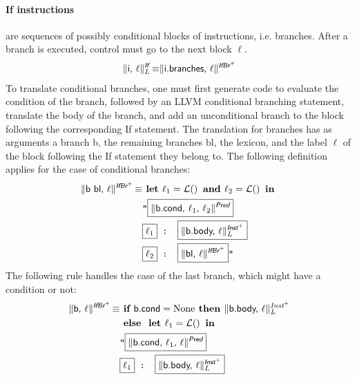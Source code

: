 \documentclass{llncs}
\newcommand{\trad}[2]{\ensuremath{\lVert \textsf{#1} \rVert^{\textit{#2}}}}
\DeclareMathOperator{\isdef}{\equiv}
\DeclareMathOperator{\lbl}{\mathcal{L}()}
\newcommand{\llvm}[1]{\texttt{#1}}
\newcommand{\B}[1]{\textsf{#1}}
\newcommand{\ListOf}[1]{$\mbox{#1}^+$}
\newcommand{\IF}[0]{\textbf{ if }}
\newcommand{\ELSE}[0]{\textbf{ else }}
\newcommand{\THEN}[0]{\textbf{ then }}
\newcommand{\LET}[0]{\textbf{ let }}
\newcommand{\IN}[0]{\textbf{ in }}
\newcommand{\AND}[0]{\textbf{ and }}
\newcommand{\PH}[1]{\framebox{$#1$}}
\begin{document}
\paragraph{If instructions} are sequences of possibly conditional blocks of
instructions, i.e. branches. After a branch is executed, control must go
to the next block $\ell$.
\begin{align*}
  \trad{i, $\ell$}{\B{If}}_L \isdef \trad{i.branches, $\ell$}{\ListOf{\B{IfBr}}}
\end{align*}
To translate conditional branches, one must first generate code to evaluate the
condition of the branch, followed by an LLVM conditional branching statement,
translate the body of the branch, and add an unconditional branch to the block
following the corresponding \B{If} statement.  The translation for branches has
as arguments a branch \B{b}, the remaining branches \B{bl}, the lexicon, and the
label $\ell$ of the block following the \B{If} statement they belong to. The
following definition applies for the case of conditional branches:
\begin{align*}
\begin{split}
  \trad{\B{b bl}, $\ell$}{\ListOf{\B{IfBr}}} \isdef & \LET \ell_1 = \lbl \AND \ell_2 = \lbl \IN \\
  & \llvm{"\PH{\trad{b.cond, $\ell_1$, $\ell_2$}{\B{Pred}}} } \\
  & \llvm{\PH{\ell_1} : \PH{\trad{b.body, $\ell$}{\ListOf{\B{Inst}}}_L}} \\
  & \llvm{\PH{\ell_2} : \PH{\trad{bl, $\ell$}{\ListOf{\B{IfBr}}}}"} \\
\end{split}
\end{align*}
The following rule handles the case of the last branch, which might have a condition or not:
\begin{align*}
\begin{split}
  \trad{\B{b}, $\ell$}{\ListOf{\B{IfBr}}} \isdef & \IF \B{b.cond} = \text{None} \THEN
  \trad{b.body, $\ell$}{\ListOf{Inst}}_L\\
  & \ELSE \LET \ell_1 = \lbl \IN \\
  & \llvm{"\PH{\trad{b.cond, $\ell_1$, $\ell$}{\B{Pred}}} } \\
  & \llvm{\PH{\ell_1} : \PH{\trad{b.body, $\ell$}{\ListOf{\B{Inst}}}_L}}
\end{split}
\end{align*}
\end{document}

